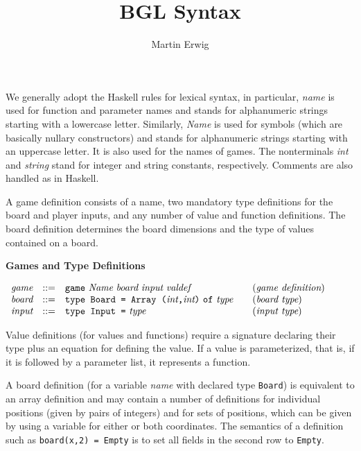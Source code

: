 \documentclass[11pt]{article}
\makeatletter
\newcommand{\prodName}[1]{&(\emph{#1})\\}
\newcommand{\nt}[1]{\textit{#1}}
\newcommand{\prog}[1]{\texttt{#1}}
\newcommand{\IS}{&::=&}
\newcommand{\syntax}[2]{
  \needspace{3\baselineskip}
  \bigskip\par\noindent\textbf{#1}\par\smallskip%
  $\begin{array}{rcl@{\qquad}l}#2\end{array}$%
  \par\bigskip\noindent\ignorespaces
}
\newcommand{\lp}{\prog{(}}
\newcommand{\rp}{\prog{)}}
\newcommand{\paren}[1]{\lp#1\rp}
\newcommand{\pair}[2]{\paren{#1\prog{,}#2}}
\makeatother
\begin{document}
\title{BGL Syntax}
\author{Martin Erwig}
\maketitle

\noindent
%
We generally adopt the Haskell rules for lexical syntax, in particular,
\nt{name} is used for function and parameter names and stands for alphanumeric
strings starting with a lowercase letter.
%
Similarly, \nt{Name} is used for symbols (which are basically nullary
constructors) and stands for alphanumeric strings starting with an uppercase
letter. It is also used for the names of games.
%
The nonterminals \nt{int} and \nt{string} stand for integer and string
constants, respectively.
%
Comments are also handled as in Haskell.

A game definition consists of a name, two mandatory type definitions for the board and player inputs, and any number of value and function definitions.
%
The board definition determines the board dimensions and the type of values
contained on a board.

\syntax{Games and Type Definitions}{
\nt{game}   \IS  \prog{game}\ \nt{Name}\ \nt{board}\ \nt{input}\ \nt{valdef}
                                                     \prodName{game definition}
\nt{board}  \IS  \prog{type Board = Array }\pair{\nt{int}}{\nt{int}}\
                 \prog{of}\ \nt{type}                \prodName{board type}
\nt{input}  \IS  \prog{type Input =}\ \nt{type}      \prodName{input type}
}
%
Value definitions (for values and functions) require a signature declaring
their type plus an equation for defining the value. If a value is
parameterized, that is, if it is followed by a parameter list, it represents a
function.

A board definition (for a variable \nt{name} with declared type \prog{Board})
is equivalent to an array definition and may contain a number of definitions
for individual positions (given by pairs of integers) and for sets of
positions, which can be given by using a variable for either or both
coordinates. The semantics of a definition such as \prog{board(x,2) = Empty} is
to set all fields in the second row to \prog{Empty}.
\end{document}
